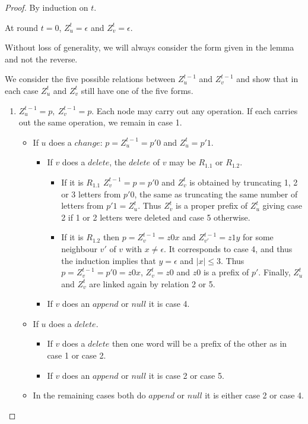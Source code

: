 \documentclass[11pt,envcountsame,letterpaper]{llncs}
\begin{document}
\begin{proof}
By induction on $t$.

At round $t=0$, $Z_u^t=\epsilon$ and $Z_v^t=\epsilon$.

Without loss of generality, we will always consider the form given in the
lemma and not the reverse.



We consider the five possible relations between  $Z_u^{t-1}$ and $Z_v^{t-1}$
and show that in each case  $Z_u^t$ and $Z_v^t$  still have one of the five
forms.
\begin{enumerate}
\item $Z_u^{t-1}=p,~Z_v^{t-1}=p$.
Each node may carry out any operation. If each carries
 out the same  operation, we remain in case 1. 
\begin{itemize}
\item If $u$ does a $change$: $p=Z_u^{t-1}=p'0$ and $Z_u^t=p'1$.
\begin{itemize}
\item If  $v$ does a $delete$, the 
$delete$ of $v$ may be $R_{1.1}$ or $R_{1.2}$. 
\begin{itemize}
\item If it is $R_{1.1}$
$Z_v^{t-1} =p = p'0$ and $Z_v^t$ is obtained by truncating 1, 2 or 3 letters from
$p'0$, the same as truncating the same number of letters from $p'1 = Z_u^t$.
Thus $Z_v^t$ is a proper prefix of $Z_u^t$ giving case 2 if 1 or 2 letters were
deleted and case 5 otherwise.
\item If it is $R_{1.2}$ then
$p=Z_v^{t-1}=z0x$ and $Z_{v'}^{t-1}=z1y$ for some neighbour $v'$ of $v$ with
$x\neq\epsilon$. 
It corresponds to case 4, and thus the induction implies that
$y=\epsilon$ and $|x|\leq 3$.
Thus $p=Z_v^{t-1}=p'0=z0x$, $Z_v^t=z0$ and $z0$ is a prefix
of $p'$. Finally, $Z_u^t$
and $Z_v^t$ are linked again by relation 2 or 5.
\end{itemize}
\item If $v$ does  an $append$ or $null$ it is case 4.
\end{itemize}

\item If $u$ does a $delete$.
\begin{itemize}
\item If  $v$ does a $delete$ then one word will be a prefix of 
the other as in case 1 or case 2.
\item If $v$ does an $append$ or $null$ it is case 2 or case 5.
\end{itemize}
\item  In the remaining cases both do $append$ or $null$ it is either case 2 
or case 4.
\end{itemize}


\end{enumerate}
\end{proof}
\end{document}

